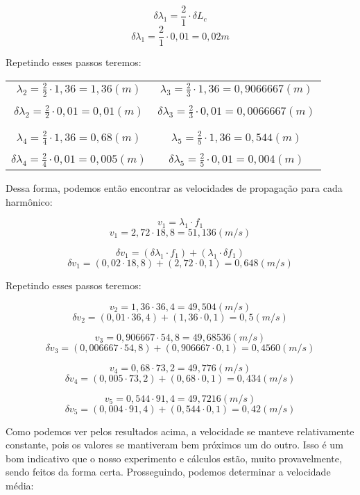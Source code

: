 \[ \delta \lambda_1 = \frac{2}{1} \cdot \delta L_c \]
\[ \delta \lambda_1 = \frac{2}{1} \cdot 0,01 = 0,02 m\]

Repetindo esses passos teremos:

\begin{table}[H]
    \centering
    \begin{tabular}{ c|c  }
         $\lambda_2 = \frac{2}{2} \cdot 1,36 = 1,36 (m)$ & $\lambda_3 = \frac{2}{3} \cdot 1,36 = 0,9066667 (m)$\\
         \\
         $\delta \lambda_2 = \frac{2}{2} \cdot 0,01 = 0,01 (m)$ & $\delta \lambda_3 = \frac{2}{3} \cdot 0,01 = 0,0066667 (m)$\\
         \\
         \hline
         \\
         $\lambda_4 = \frac{2}{4} \cdot 1,36 = 0,68 (m)$ & $\lambda_5 = \frac{2}{5} \cdot 1,36 = 0,544 (m)$\\
         \\
         $\delta \lambda_4 = \frac{2}{4} \cdot 0,01 = 0,005 (m)$ & $\delta \lambda_5 = \frac{2}{5} \cdot 0,01 = 0,004 (m)$\\
    \end{tabular}
\end{table}

Dessa forma, podemos então encontrar as velocidades de propagação para cada harmônico:

\[ v_1 = \lambda_1 \cdot f_1 \]
\[ v_1 = 2,72 \cdot 18,8 = 51,136 (m/s) \]

\[ \delta v_1 = (\delta \lambda_1 \cdot f_1) + (\lambda_1 \cdot \delta f_1) \]
\[ \delta v_1 = (0,02 \cdot 18,8) + (2,72 \cdot 0,1) = 0,648 (m/s) \]

Repetindo esses passos teremos:

\[ v_2 = 1,36 \cdot 36,4 = 49,504 (m/s) \]
\[ \delta v_2 = (0,01 \cdot 36,4) + (1,36 \cdot 0,1) = 0,5 (m/s) \]

\[ v_3 = 0,906667 \cdot 54,8 = 49,68536 (m/s) \]
\[ \delta v_3 = (0,006667 \cdot 54,8) + (0,906667 \cdot 0,1) = 0,4560 (m/s) \]

\[ v_4 = 0,68 \cdot 73,2 = 49,776 (m/s) \]
\[ \delta v_4 = (0,005 \cdot 73,2) + (0,68 \cdot 0,1) = 0,434 (m/s) \]

\[ v_5 = 0,544 \cdot 91,4 = 49,7216 (m/s) \]
\[ \delta v_5 = (0,004 \cdot 91,4) + (0,544 \cdot 0,1) = 0,42 (m/s) \]

Como podemos ver pelos resultados acima, a velocidade se manteve relativamente constante, pois os valores se mantiveram bem próximos um do outro. Isso é um bom indicativo que o nosso experimento e cálculos estão, muito provavelmente, sendo feitos da forma certa. Prosseguindo, podemos determinar a velocidade média:

